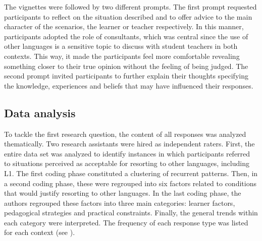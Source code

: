 \documentclass[output=paper]{../langscibook}
\begin{document}
The vignettes were followed by two different prompts. The first prompt requested participants to reflect on the situation described and to offer advice to the main character of the scenarios, the learner or teacher respectively. In this manner, participants adopted the role of consultants, which was central since the use of other languages is a sensitive topic to discuss with student teachers in both contexts. This way, it made the participants feel more comfortable revealing something closer to their true opinion without the feeling of being judged. The second prompt invited participants to further explain their thoughts specifying the knowledge, experiences and beliefs that may have influenced their responses.



\subsection{Data analysis}
To tackle the first research question, the content of all responses was analyzed thematically. Two research assistants were hired as independent raters. First, the entire data set was analyzed to identify instances in which participants referred to situations perceived as acceptable for resorting to other languages, including L1. The first coding phase constituted a clustering of recurrent patterns. Then, in a second coding phase, these were regrouped into six factors related to conditions that would justify resorting to other languages. In the last coding phase, the authors regrouped these factors into three main categories: learner factors, pedagogical strategies and practical constraints. Finally, the general trends within each category were interpreted. The frequency of each response type was listed for each context (see ).
\end{document}

